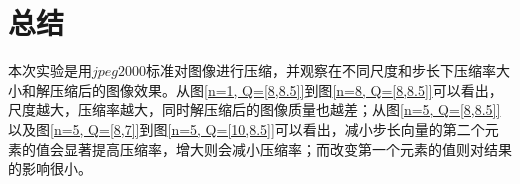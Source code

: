 \documentclass[UTF8]{ctexart}
\begin{document}
                            
                                   

	\section{总结}
		
        \indent 本次实验是用$jpeg2000$标准对图像进行压缩，并观察在不同尺度和步长下压缩率大小和解压缩后的图像效果。从图\ref{n=1, Q=[8,8.5]}到图\ref{n=8, Q=[8,8.5]}可以看出，尺度越大，压缩率越大，同时解压缩后的图像质量也越差；从图\ref{n=5, Q=[8,8.5]}以及图\ref{n=5, Q=[8,7]}到图\ref{n=5, Q=[10,8.5]}可以看出，减小步长向量的第二个元素的值会显著提高压缩率，增大则会减小压缩率；而改变第一个元素的值则对结果的影响很小。
        
        
        
		

		
	
	
%
%

\end{document}
